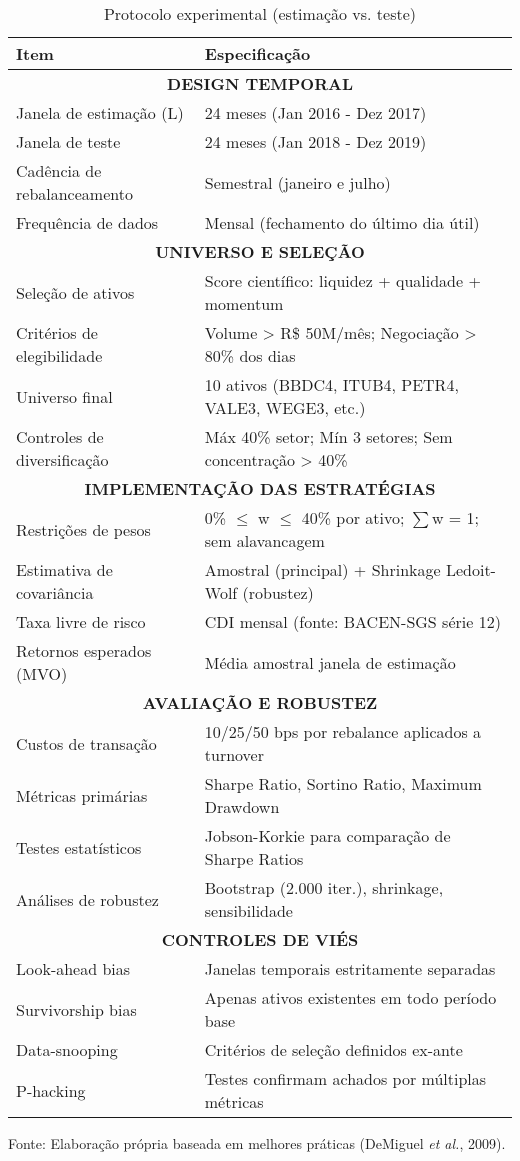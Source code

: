 \begin{table}[H]
\centering
\caption{Protocolo experimental (estimação vs. teste)}
\label{tab:protocolo_experimental}
\begin{tabular}{|l|l|}
\hline
\textbf{Item} & \textbf{Especificação} \\
\hline
\multicolumn{2}{|c|}{\textbf{DESIGN TEMPORAL}} \\
\hline
Janela de estimação (L) & 24 meses (Jan 2016 - Dez 2017) \\
Janela de teste & 24 meses (Jan 2018 - Dez 2019) \\
Cadência de rebalanceamento & Semestral (janeiro e julho) \\
Frequência de dados & Mensal (fechamento do último dia útil) \\
\hline
\multicolumn{2}{|c|}{\textbf{UNIVERSO E SELEÇÃO}} \\
\hline
Seleção de ativos & Score científico: liquidez + qualidade + momentum \\
Critérios de elegibilidade & Volume > R\$ 50M/mês; Negociação > 80\% dos dias \\
Universo final & 10 ativos (BBDC4, ITUB4, PETR4, VALE3, WEGE3, etc.) \\
Controles de diversificação & Máx 40\% setor; Mín 3 setores; Sem concentração > 40\% \\
\hline
\multicolumn{2}{|c|}{\textbf{IMPLEMENTAÇÃO DAS ESTRATÉGIAS}} \\
\hline
Restrições de pesos & 0\% $\leq$ w $\leq$ 40\% por ativo; $\sum$w = 1; sem alavancagem \\
Estimativa de covariância & Amostral (principal) + Shrinkage Ledoit-Wolf (robustez) \\
Taxa livre de risco & CDI mensal (fonte: BACEN-SGS série 12) \\
Retornos esperados (MVO) & Média amostral janela de estimação \\
\hline
\multicolumn{2}{|c|}{\textbf{AVALIAÇÃO E ROBUSTEZ}} \\
\hline
Custos de transação & 10/25/50 bps por rebalance aplicados a turnover \\
Métricas primárias & Sharpe Ratio, Sortino Ratio, Maximum Drawdown \\
Testes estatísticos & Jobson-Korkie para comparação de Sharpe Ratios \\
Análises de robustez & Bootstrap (2.000 iter.), shrinkage, sensibilidade \\
\hline
\multicolumn{2}{|c|}{\textbf{CONTROLES DE VIÉS}} \\
\hline
Look-ahead bias & Janelas temporais estritamente separadas \\
Survivorship bias & Apenas ativos existentes em todo período base \\
Data-snooping & Critérios de seleção definidos ex-ante \\
P-hacking & Testes confirmam achados por múltiplas métricas \\
\hline
\end{tabular}
\footnotesize
Fonte: Elaboração própria baseada em melhores práticas (DeMiguel \textit{et al.}, 2009).
\end{table}

